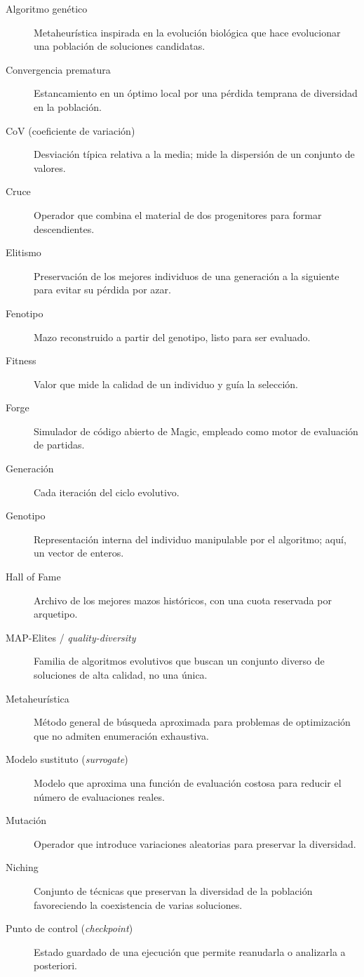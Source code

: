 \begin{description}
    \item[Algoritmo genético] Metaheurística inspirada en la evolución biológica que hace evolucionar una población de soluciones candidatas.
    \item[Convergencia prematura] Estancamiento en un óptimo local por una pérdida temprana de diversidad en la población.
    \item[CoV (coeficiente de variación)] Desviación típica relativa a la media; mide la dispersión de un conjunto de valores.
    \item[Cruce] Operador que combina el material de dos progenitores para formar descendientes.
    \item[Elitismo] Preservación de los mejores individuos de una generación a la siguiente para evitar su pérdida por azar.
    \item[Fenotipo] Mazo reconstruido a partir del genotipo, listo para ser evaluado.
    \item[Fitness] Valor que mide la calidad de un individuo y guía la selección.
    \item[Forge] Simulador de código abierto de Magic, empleado como motor de evaluación de partidas.
    \item[Generación] Cada iteración del ciclo evolutivo.
    \item[Genotipo] Representación interna del individuo manipulable por el algoritmo; aquí, un vector de enteros.
    \item[Hall of Fame] Archivo de los mejores mazos históricos, con una cuota reservada por arquetipo.
    \item[MAP-Elites / \emph{quality-diversity}] Familia de algoritmos evolutivos que buscan un conjunto diverso de soluciones de alta calidad, no una única.
    \item[Metaheurística] Método general de búsqueda aproximada para problemas de optimización que no admiten enumeración exhaustiva.
    \item[Modelo sustituto (\emph{surrogate})] Modelo que aproxima una función de evaluación costosa para reducir el número de evaluaciones reales.
    \item[Mutación] Operador que introduce variaciones aleatorias para preservar la diversidad.
    \item[Niching] Conjunto de técnicas que preservan la diversidad de la población favoreciendo la coexistencia de varias soluciones.
    \item[Punto de control (\emph{checkpoint})] Estado guardado de una ejecución que permite reanudarla o analizarla a posteriori.

\end{description}
